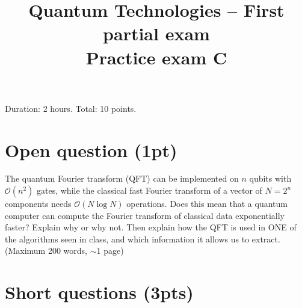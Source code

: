 \documentclass[11pt,a4paper]{article}
\title{Quantum Technologies -- First partial exam\\[4pt] \large Practice exam C}
\date{}
\begin{document}
\maketitle
\vspace{-1.5cm}
\begin{center}
Duration: 2 hours. Total: 10 points.
\end{center}

\section{Open question (1pt)}

The quantum Fourier transform (QFT) can be implemented on $n$ qubits with $\mathcal O(n^2)$ gates,
while the classical fast Fourier transform of a vector of $N=2^n$ components needs
$\mathcal O(N\log N)$ operations. Does this mean that a quantum computer can compute the Fourier
transform of classical data exponentially faster? Explain why or why not. Then explain how the QFT
is used in ONE of the algorithms seen in class, and which information it allows us to extract.
(Maximum 200 words, $\sim$1 page)

\section{Short questions (3pts)}
\end{document}
